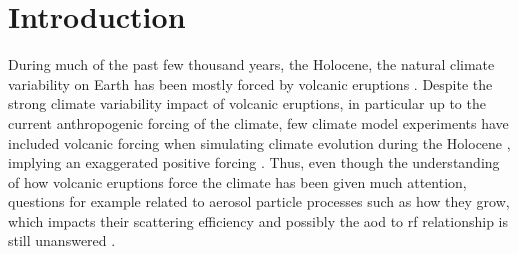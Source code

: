 \documentclass{ametsocV6.1}
\begin{document}

\section{Introduction}




During much of the past few thousand years, the Holocene, the natural climate
variability on Earth has been mostly forced by volcanic eruptions \citep{sigl2022}.
Despite the strong climate variability impact of volcanic eruptions, in particular up to
the current anthropogenic forcing of the climate, few climate model experiments have
included volcanic forcing when simulating climate evolution during the Holocene
\citep{sigl2022}, implying an exaggerated positive forcing \citep{gregory2016}. Thus,
even though the understanding of how volcanic eruptions force the climate has been given
much attention, questions for example related to aerosol particle processes such as how
they grow, which impacts their scattering efficiency and possibly the \gls{aod} to
\gls{rf} relationship is still unanswered
\citep[e.g.][]{robock2000,zanchettin2019,marshall2020,marshall2022}.
\end{document}
